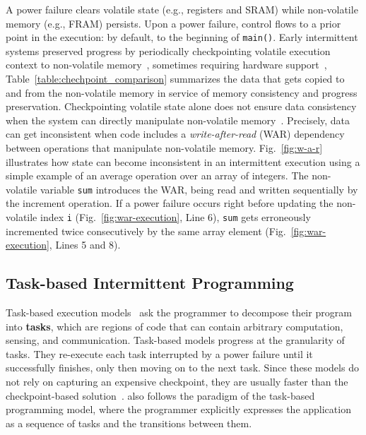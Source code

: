 A power failure clears volatile state (e.g., registers and SRAM) while non-volatile memory (e.g., FRAM) persists. Upon a power failure, control flows to a prior point in the execution: by default, to the beginning of {\tt main()}. Early intermittent systems preserved progress by periodically checkpointing volatile execution context to non-volatile memory~\cite{mementos}, sometimes requiring hardware support~\cite{mottola2017harvos,hibernusplusplus,hibernus,idetic,quickrecall}, Table~\ref{table:chechpoint_comparison} summarizes the data that gets copied to and from the non-volatile memory in service of memory consistency and progress preservation. Checkpointing volatile state alone does not ensure data consistency when the system can directly manipulate non-volatile memory~\cite{mspcdino}. Precisely, data can get inconsistent when code includes a \emph{write-after-read} (WAR) dependency between operations that manipulate non-volatile memory. Fig.~\ref{fig:w-a-r} illustrates how state can become inconsistent in an intermittent execution using a simple example of an average operation over an array of integers.
The non-volatile variable \texttt{sum} introduces the WAR, being read and written sequentially by the increment operation. If a power failure occurs right before updating the non-volatile index \texttt{i} (Fig.~\ref{fig:war-execution}, Line 6), \texttt{sum} gets erroneously incremented twice consecutively by the same array element (Fig.~\ref{fig:war-execution}, Lines 5 and 8).

\subsection{Task-based Intermittent Programming}
\label{section:background_task_computing}

Task-based execution models~\cite{dino,chain,alpaca} ask the programmer to decompose their program into \textbf{tasks}, which are regions of code that can contain arbitrary computation, sensing, and communication. Task-based models progress at the granularity of tasks. They re-execute each task interrupted by a power failure until it successfully finishes, only then moving on to the next task. Since these models do not rely on capturing an expensive checkpoint, they are usually faster than the checkpoint-based solution~\cite{chain, alpaca}.  \sys also follows the paradigm of the task-based programming model, where the programmer explicitly expresses the application as a sequence of tasks and the transitions between them.

